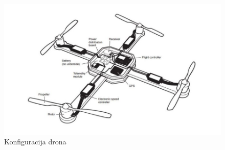 \documentclass[times, utf8, diplomski]{fer}
\begin{document}
\begin{figure}[htb]
\centering
\includegraphics[width=13cm]{img/konfiguracijaDrona.png}
\caption{Konfiguracija drona\protect\footnotemark}
\label{fig:konfiguracijaDrona}
\end{figure}
\end{document}
